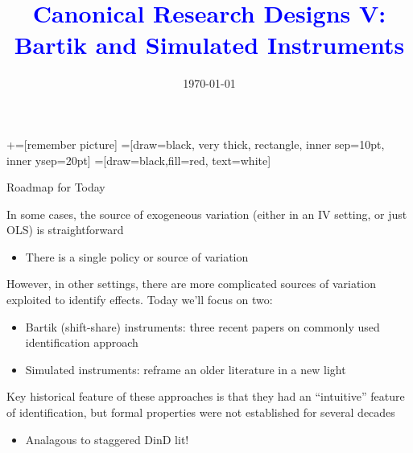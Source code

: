 \documentclass[notes,11pt, aspectratio=169]{beamer}
\title[]{\textcolor{blue}{Canonical Research Designs V:\\ Bartik and Simulated Instruments }}
\author[PGP]{}
\institute[FRBNY]{\small{\begin{tabular}{c}
  Paul Goldsmith-Pinkham  \\
\end{tabular}}}
\date{\today}
\newenvironment{wideitemize}{\itemize\addtolength{\itemsep}{10pt}}{\enditemize}
\begin{document}
\newcommand\marktopleft[1]{%
    \tikz[overlay,remember picture] 
        \node (marker-#1-a) at (-.3em,.3em) {};%
}
\newcommand\markbottomright[2]{%
    \tikz[overlay,remember picture] 
        \node (marker-#1-b) at (0em,0em) {};%
}
+=[remember picture] 
 =[draw=black, very thick, rectangle, inner sep=10pt, inner ysep=20pt]
 =[draw=black,fill=red, text=white]

\begin{frame}
\maketitle
\end{frame}

\begin{frame}{Roadmap for Today}
  \begin{wideitemize}
  \item In some cases, the source of exogeneous variation (either in an IV setting, or just OLS) is straightforward
    \begin{itemize}
    \item There is a single policy or source of variation
    \end{itemize}
  \item However, in other settings, there are more complicated sources of variation exploited to identify effects. Today we'll focus on two:
    \begin{itemize}
    \item Bartik (shift-share) instruments: three recent
      papers on commonly used identification approach
    \item Simulated instruments: reframe an older literature in a new light
    \end{itemize}
  \item Key historical feature of these approaches is that they had an ``intuitive'' feature of identification, but formal properties were not established for several decades
    \begin{itemize}
    \item Analagous to staggered DinD lit!
    \end{itemize}
  \end{wideitemize}
\end{frame}
\end{document}
